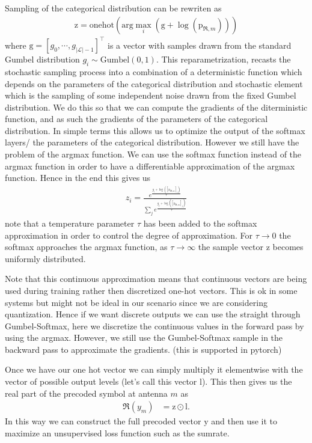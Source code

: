 \documentclass[12pt]{article}
\newcommand{\vect}[1]{\boldsymbol{\mathrm{#1}}}
\theoremstyle{remark}
\begin{document}
Sampling of the categorical distribution can be rewriten as 
\begin{align}
	\vect{z} =  \mathrm{onehot}\left( \mathrm{arg}\max_i \left( \vect{g} + \log(\vect{p}_{\Re, m}) \right) \right)
\end{align}
where $\vect{g} = [g_0, \cdots, g_{|\mathcal{L}|-1}]^{\intercal}$ is a vector with samples drawn from the standard Gumbel distribution $g_i\sim\mathrm{Gumbel}(0, 1)$. This reparametrization, recasts the stochastic sampling process into a combination of a deterministic function which depends on the parameters of the categorical distribution and stochastic element which is the sampling of some independent noise drawn from the fixed Gumbel distribution. We do this so that we can compute the gradients of the diterministic function, and as such the gradients of the parameters of the categorical distribution. In simple terms this allows us to optimize the output of the softmax layers/ the parameters of the categorical distribution. However we still have the problem of the argmax function. We can use the softmax function instead of the argmax function in order to have a differentiable approximation of the argmax function. Hence in the end this gives us
\begin{align}
	z_i = \frac{e^{\frac{g_i + \log([\vect{p}_{\Re, m}]_i)}{\tau}}}{\sum_j e^{\frac{g_j + \log([\vect{p}_{\Re, m}]_j)}{\tau}}}
\end{align}
note that a temperature parameter $\tau$ has been added to the softmax approximation in order to control the degree of approximation. For $\tau \to 0$ the softmax approaches the argmax function, as $\tau \to \infty$ the sample vector $\vect{z}$ becomes uniformly distributed.

Note that this continuous approximation means that continuous vectors are being used during training rather then discretized one-hot vectors. This is ok in some systems but might not be ideal in our scenario since we are considering quantization. Hence if we want discrete outputs we can use the straight through Gumbel-Softmax, here we discretize the continuous values in the forward pass by using the argmax. However, we still use the Gumbel-Softmax sample in the backward pass to approximate the gradients. (this is supported in pytorch)

Once we have our one hot vector we can simply multiply it elementwise with the vector of possible output levels (let's call this vector $\vect{l}$). This then gives us the real part of the precoded symbol at antenna $m$ as
\begin{align}
	\Re\left(y_m\right) &= \vect{z} \odot \vect{l}.
\end{align}
In this way we can construct the full precoded vector $\vect{y}$ and then use it to maximize an unsupervised loss function such as the sumrate.
\end{document}

